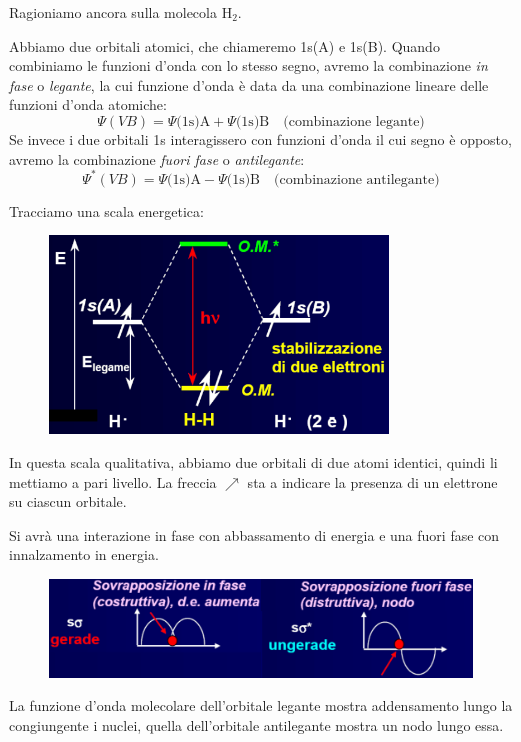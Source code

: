 Ragioniamo ancora sulla molecola H$_2$.

Abbiamo due orbitali atomici, che chiameremo 1s(A) e 1s(B). Quando combiniamo le funzioni d'onda con lo stesso segno, avremo la combinazione \textit{in fase} o \textit{legante}, la cui funzione d'onda è data da una combinazione lineare delle funzioni d'onda atomiche:
$$\Psi(VB)=\Psi\text{(1s)A} + \Psi\text{(1s)B} \quad \text{(combinazione legante)}$$
Se invece i due orbitali 1s interagissero con funzioni d'onda il cui segno è opposto, avremo la combinazione \textit{fuori fase} o \textit{antilegante}:
$$\Psi^*(VB)=\Psi\text{(1s)A} - \Psi\text{(1s)B} \quad \text{(combinazione antilegante)}$$

Tracciamo una scala energetica:

\begin{figure}[htp]
    \centering
    \includegraphics[width=9cm]{immagini/scala_energia_H_2.png}
\end{figure}

In questa scala qualitativa, abbiamo due orbitali di due atomi identici, quindi li mettiamo a pari livello. La freccia $\nearrow$ sta a indicare la presenza di un elettrone su ciascun orbitale.

Si avrà una interazione in fase con abbassamento di energia e una fuori fase con innalzamento in energia.

\begin{figure}[htp]
    \centering
    \includegraphics[width=12cm]{immagini/sovrapposizione_in_fase_e_fuori_fase.png}
\end{figure}

La funzione d'onda molecolare dell'orbitale legante mostra addensamento lungo la congiungente i nuclei, quella dell'orbitale antilegante mostra un nodo lungo essa.

